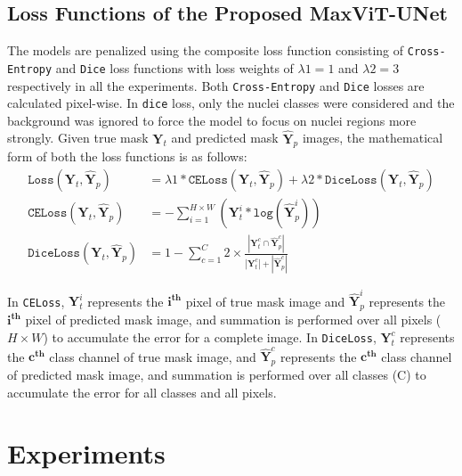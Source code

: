 \documentclass{article}
\begin{document}
\subsection{Loss Functions of the Proposed MaxViT-UNet}\label{Loss Functions of the Proposed MaxViT-UNet}

The models are penalized using the composite loss function consisting of \texttt{Cross-Entropy} and \texttt{Dice} loss functions with loss weights of \(\lambda1=1\) and \(\lambda2=3\) respectively in all the experiments. Both \texttt{Cross-Entropy} and \texttt{Dice} losses are calculated pixel-wise. In \texttt{dice} loss, only the nuclei classes were considered and the background was ignored to force the model to focus on nuclei regions more strongly. Given true mask \(\textbf{Y}_{t}\) and predicted mask \(\hat{\textbf{Y}}_{p}\) images, the mathematical form of both the loss functions is as follows:
\begin{align}
\texttt{Loss}(\textbf{Y}_{t}, \hat{\textbf{Y}}_{p}) &= \lambda1 * \texttt{CELoss}(\textbf{Y}_{t}, \hat{\textbf{Y}}_{p}) + \lambda2 * \texttt{DiceLoss}(\textbf{Y}_{t}, \hat{\textbf{Y}}_{p}) \\
\texttt{CELoss}(\textbf{Y}_{t}, \hat{\textbf{Y}}_{p}) &= -\sum_{i=1}^{H \times W} (\textbf{Y}_{t}^{i} * \texttt{log}(\hat{\textbf{Y}}_{p}^{i})) \\
\texttt{DiceLoss}(\textbf{Y}_{t}, \hat{\textbf{Y}}_{p}) &= 1 - \sum_{c=1}^{C} 2 \times \frac{|\textbf{Y}_{t}^{c} \cap \hat{\textbf{Y}}_{p}^{c}|}{|\textbf{Y}_{t}^{c}| + |\hat{\textbf{Y}}_{p}^{c}|}
\end{align}

In \texttt{CELoss}, \(\textbf{Y}_{t}^{i}\) represents the \(\textbf{i}^{\textbf{th}}\) pixel of true mask image and \(\hat{\textbf{Y}}_{p}^{i}\) represents the \(\textbf{i}^{\textbf{th}}\) pixel of predicted mask image, and summation is performed over all pixels (\(H \times W\)) to accumulate the error for a complete image. In \texttt{DiceLoss}, \(\textbf{Y}_{t}^{c}\) represents the \(\textbf{c}^{\textbf{th}}\) class channel of true mask image, and \(\hat{\textbf{Y}}_{p}^{c}\) represents the \(\textbf{c}^{\textbf{th}}\) class channel of predicted mask image, and summation is performed over all classes (C) to accumulate the error for all classes and all pixels.

\section{Experiments}\label{Experiments}
\end{document}
